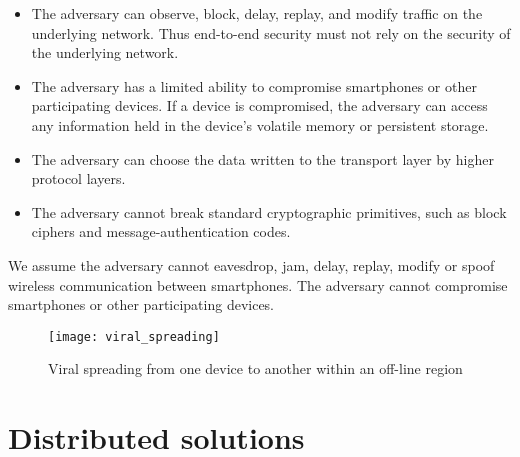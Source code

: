 \begin{itemize}
\item{
	The adversary can observe, block, delay, replay, and modify traffic on the underlying network.
	Thus end-to-end security must not rely on the security of the underlying network.
}
\item{
	The adversary has a limited ability to compromise smartphones or other participating devices.
	If a device is compromised, the adversary can access any information held in the device's volatile memory or persistent storage.
}
\item{
	The adversary can choose the data written to the transport layer by higher protocol layers.
}
\item{
	The adversary cannot break standard cryptographic primitives, such as block ciphers and message-authentication codes.
}
\end{itemize}
We assume the adversary cannot eavesdrop, jam, delay, replay, modify or spoof wireless communication between smartphones.
The adversary cannot compromise smartphones or other participating devices.

\begin{figure}[H]
	\centering
	\texttt{[image: viral\_spreading]}
	\caption{Viral spreading from one device to another within an off-line region}
	\label{fig:viral_spreading}
\end{figure}

\section{Distributed solutions}\label{sec:distributed_solutions}

